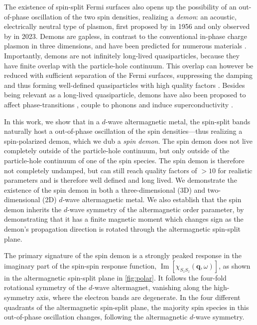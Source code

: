 \documentclass[aps,prl,reprint,twocolumns,superscriptaddress]{revtex4-2}
\DeclareMathOperator{\Imm}{Im}
\begin{document}
	The existence of spin-split Fermi surfaces also opens up the possibility of an out-of-phase oscillation of the two spin densities, realizing a \emph{demon}: an acoustic, electrically neutral type of plasmon, first proposed by \textcite{pinesElectronInteractionSolids1956} in 1956 and only observed by \textcite{husainPinesDemonObserved2023} in 2023. Demons are gapless, in contrast to the conventional in-phase charge plasmon in three dimensions, and have  been predicted for numerous materials \cite{pinesElectronInteractionSolids1956,ruvaldsAreThereAcoustic1981,dassarmaCollectiveModesSpatially1981,sadhukhanNovelUndampedGapless2020,afanasievAcousticPlasmonsTypeI2021}. Importantly, demons are not infinitely long-lived quasiparticles, because they have finite overlap with the particle-hole continuum. This overlap can however be reduced with sufficient separation of the Fermi surfaces, suppressing the damping and thus forming well-defined quasiparticles with high quality factors \cite{agarwalLonglivedSpinPlasmons2014,husainPinesDemonObserved2023}. Besides being relevant as a long-lived quasiparticle, demons have also been proposed to affect phase-transitions \cite{varmaMixedvalenceCompounds1976a}, couple to phonons \cite{sinhaPossibilityAcousticPlasmons1983} and induce superconductivity \cite{ihmDemonsSuperconductivity1981,ruvaldsAreThereAcoustic1981,afanasievAcousticPlasmonsTypeI2021}.
	
	
	In this work, we show that in a $d$-wave altermagnetic metal, the spin-split bands naturally host a out-of-phase oscillation of the spin densities---thus realizing a spin-polarized demon, which we dub a \emph{spin demon}. 
	The spin demon does not live completely outside of the particle-hole continuum, but only outside of the particle-hole continuum of one of the spin species. The spin demon is therefore not completely undamped, but can still reach quality factors of $>10$ for realistic parameters and is therefore well defined and long lived. We demonstrate the existence of the spin demon in both a three-dimensional (3D) and two-dimensional (2D) $d$-wave altermagnetic metal. We also establish that the spin demon inherits the $d$-wave symmetry of the altermagnetic order parameter, by demonstrating that it has a finite magnetic moment which changes sign as the demon's propagation  direction is rotated through the altermagnetic spin-split plane. 
	
	The primary signature of the spin demon is a strongly peaked response in the imaginary part of the spin-spin response function, $\Imm[\chi_{S_zS_z}(\bm q,\omega)]$, as shown in the altermagnetic spin-split plane in \cref{fig:polar}. It follows the four-fold rotational symmetry of the $d$-wave altermagnet, vanishing along the high-symmetry axis, where the electron bands are degenerate. In the four different quadrants of the altermagnetic spin-split plane, the majority spin species in this out-of-phase oscillation changes, following the altermagnetic $d$-wave symmetry. 
	
\end{document}
